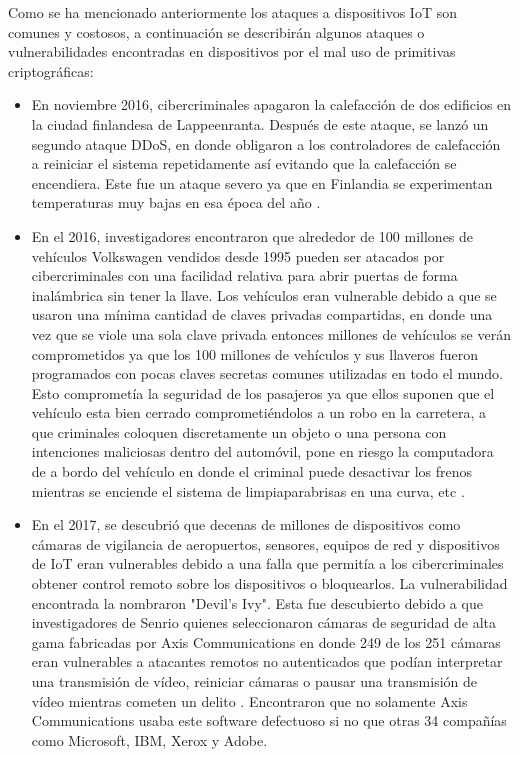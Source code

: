 \documentclass{article}
\begin{document}
            Como se ha mencionado anteriormente los ataques a dispositivos IoT son comunes y costosos, a continuación se describirán algunos ataques o vulnerabilidades encontradas en dispositivos por el mal uso de primitivas criptográficas:

            \begin{itemize}
                \item En noviembre 2016, cibercriminales apagaron la calefacción de dos edificios en la ciudad finlandesa de Lappeenranta. Después de este ataque, se lanzó un segundo ataque DDoS, en donde obligaron a los controladores de calefacción a reiniciar el sistema repetidamente así evitando que la calefacción se encendiera. Este fue un ataque severo ya que en Finlandia se experimentan temperaturas muy bajas en esa época del año \cite{husar_2022}.
                \item En el 2016, investigadores encontraron que alrededor de 100 millones de vehículos Volkswagen vendidos desde 1995 pueden ser atacados por cibercriminales con una facilidad relativa para abrir puertas de forma inalámbrica sin tener la llave. Los vehículos eran vulnerable debido a que se usaron una mínima cantidad de claves privadas compartidas, en donde una vez que se viole una sola clave privada entonces millones de vehículos se verán comprometidos ya que los 100 millones de vehículos y sus llaveros fueron programados con pocas claves secretas comunes utilizadas en todo el mundo. Esto comprometía la seguridad de los pasajeros ya que ellos suponen que el vehículo esta bien cerrado comprometiéndolos a un robo en la carretera, a que criminales coloquen discretamente un objeto o una persona con intenciones maliciosas dentro del automóvil, pone en riesgo la computadora de a bordo del vehículo en donde el criminal puede  desactivar los frenos mientras se enciende el sistema de limpiaparabrisas en una curva, etc  \cite{garcia_oswald_kasper_pavlides}.
                \item En el 2017, se descubrió que decenas de millones de dispositivos como cámaras de vigilancia de aeropuertos, sensores, equipos de red y dispositivos de IoT eran vulnerables debido a una falla que permitía a los cibercriminales obtener control remoto sobre los dispositivos o bloquearlos. La vulnerabilidad encontrada la nombraron "Devil's Ivy". Esta fue descubierto debido a que investigadores de Senrio quienes seleccionaron cámaras de seguridad de alta gama fabricadas por Axis Communications en donde 249 de los 251 cámaras eran vulnerables a atacantes remotos no autenticados que podían interpretar una transmisión de vídeo, reiniciar cámaras o pausar una transmisión de vídeo mientras cometen un delito \cite{spring_2019}. Encontraron que no solamente Axis Communications usaba este software defectuoso si no que otras 34 compañías como Microsoft, IBM, Xerox y Adobe.

            \end{itemize}
\end{document}
